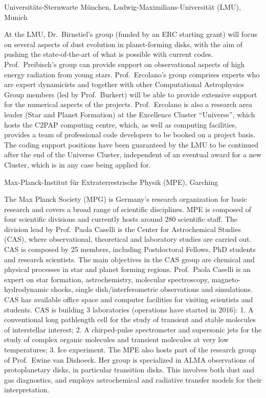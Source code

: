 \documentclass[10pt,fleqn,twoside,a4paper]{article}
\begin{document}
\begin{Emphasize}
Universit\"ats-Sternwarte M\"unchen, Ludwig-Maximilians-Universit\"at (LMU), Munich\\
\end{Emphasize}
At the LMU, Dr.\ Birnstiel's group (funded by an ERC starting grant)
will focus on several aspects of dust evolution in planet-forming
disks, with the aim of pushing the state-of-the-art of what is
possible with current codes. Prof.~Preibisch's group can provide
support on observational aspects of high energy radiation from young
stars. Prof.~Ercolano's group comprises experts who are expert
dynamicists
and together with other Computational Astrophysics Group members (led
by Prof.~Burkert) will be
able to provide extensive support for the numerical aspects of the
projects. Prof.~Ercolano is also a research area leader (Star and
Planet Formation) at the
Excellence Cluster ``Universe'', which hosts the C2PAP computing
centre, which, as well as computing facilities, provides a team of
professional code developers to be booked on a project basis. The
coding support positions have been guaranteed by the LMU to be
continued after the end of the Universe Cluster, independent of an
eventual award for a new Cluster, which is in any case being applied for. 
\vspace{1em}

\begin{Emphasize}
Max-Planck-Institut f\"ur Extraterrestrische Physik (MPE), Garching\\
\end{Emphasize}
The Max Planck Society (MPG) is Germany's research organization for basic research and
covers a broad range of scientific disciplines.  MPE is composed of four scientific divisions and currently hosts around 280 scientific staff. The division lead by Prof.~Paola Caselli is the Center for Astrochemical Studies (CAS), where observational,
theoretical and laboratory studies are carried out. CAS is composed by 25 members,
including Postdoctoral Fellows, PhD students and research scientists. The main objectives in
the CAS group are chemical and physical processes in star and planet forming regions.  Prof.~Paola Caselli is an expert on star formation, astrochemistry, molecular
spectroscopy, magneto-hydrodynamic shocks, single dish/interferometric observations and
simulations.
CAS has available office space and computer facilities for visiting scientists and students.
CAS is building 3 laboratories (operations have started in 2016): 1. A conventional long pathlength cell for the study of
transient and stable molecules of interstellar interest; 2. A
chirped-pulse spectrometer and supersonic jets for the study of complex organic molecules and transient molecules at very
low temperatures; 3. Ice experiment.
The MPE also hosts part of the research group of Prof.~Ewine van
Dishoeck. Her group is specialized in ALMA observations of protoplanetary
disks, in particular transition disks.  This involves both dust and gas
diagnostics, and employs astrochemical and radiative transfer models for
their interpretation.
\vspace{1em}
\end{document}
